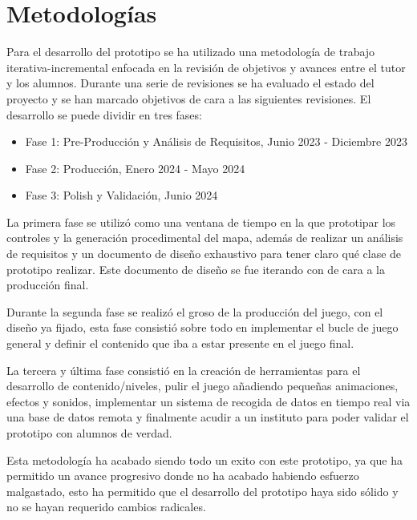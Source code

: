 \section{Metodologías}

Para el desarrollo del prototipo se ha utilizado una metodología de trabajo iterativa-incremental enfocada en la revisión de objetivos y
avances entre el tutor y los alumnos. Durante una serie de revisiones se ha evaluado el estado del proyecto y se han marcado objetivos de cara a las siguientes revisiones. El desarrollo se puede dividir en tres fases: 
\begin{itemize}
	\item Fase 1: Pre-Producción y Análisis de Requisitos, Junio 2023 - Diciembre 2023
	\item Fase 2: Producción, Enero 2024 - Mayo 2024
	\item Fase 3: Polish y Validación, Junio 2024 
\end{itemize}

La primera fase se utilizó como una ventana de tiempo en la que prototipar los controles y la generación procedimental del mapa, además de realizar un análisis de requisitos y un documento de diseño exhaustivo para tener claro qué clase de prototipo realizar. Este documento de diseño se fue iterando con \nombretutor de cara a la producción final.

Durante la segunda fase se realizó el groso de la producción del juego, con el diseño ya fijado, esta fase consistió sobre todo en implementar el bucle de juego general y definir el contenido que iba a estar presente en el juego final.

La tercera y última fase consistió en la creación de herramientas para el desarrollo de contenido/niveles, pulir el juego añadiendo pequeñas animaciones, efectos y sonidos, implementar un sistema de recogida de datos en tiempo real via una base de datos remota y finalmente acudir a un instituto para poder validar el prototipo con alumnos de verdad.

Esta metodología ha acabado siendo todo un exito con este prototipo, ya que ha permitido un avance progresivo donde no ha acabado habiendo esfuerzo malgastado, esto ha permitido que el desarrollo del prototipo haya sido sólido y no se hayan requerido cambios radicales.